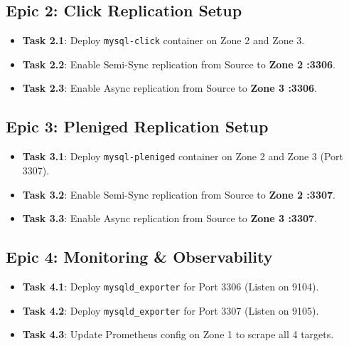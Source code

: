 \documentclass[11pt,a4paper]{article}
\begin{document}
\subsection{Epic 2: Click Replication Setup}
\begin{itemize}[label=$\square$]
    \item \textbf{Task 2.1}: Deploy \texttt{mysql-click} container on Zone 2 and Zone 3.
    \item \textbf{Task 2.2}: Enable Semi-Sync replication from Source to \textbf{Zone 2 :3306}.
    \item \textbf{Task 2.3}: Enable Async replication from Source to \textbf{Zone 3 :3306}.
\end{itemize}

\subsection{Epic 3: Pleniged Replication Setup}
\begin{itemize}[label=$\square$]
    \item \textbf{Task 3.1}: Deploy \texttt{mysql-pleniged} container on Zone 2 and Zone 3 (Port 3307).
    \item \textbf{Task 3.2}: Enable Semi-Sync replication from Source to \textbf{Zone 2 :3307}.
    \item \textbf{Task 3.3}: Enable Async replication from Source to \textbf{Zone 3 :3307}.
\end{itemize}

\subsection{Epic 4: Monitoring \& Observability}
\begin{itemize}[label=$\square$]
    \item \textbf{Task 4.1}: Deploy \texttt{mysqld\_exporter} for Port 3306 (Listen on 9104).
    \item \textbf{Task 4.2}: Deploy \texttt{mysqld\_exporter} for Port 3307 (Listen on 9105).
    \item \textbf{Task 4.3}: Update Prometheus config on Zone 1 to scrape all 4 targets.
\end{itemize}
\end{document}
